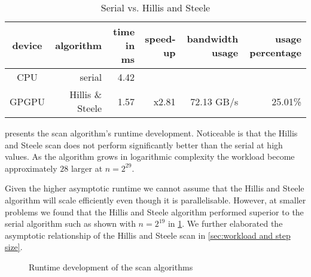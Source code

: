 \begin{table}[htb]
  \centering
  \begin{tabular}{c r | r r r r}
    \toprule
    device & algorithm & time in ms & speed-up & bandwidth usage & usage percentage\\
    \midrule
    CPU & serial  & 4.42 &  &  &  \\
    GPGPU & Hillis \& Steele & 1.57 & x2.81 & 72.13 GB/s & 25.01\% \\
    \bottomrule
  \end{tabular}
  \caption{Serial vs. Hillis and Steele}
  \label{tab:cpu vs hillis steele}
\end{table}

 presents the scan algorithm's runtime development.
Noticeable is that the Hillis and Steele scan does not perform significantly better than the serial at high values.
As the algorithm grows in logarithmic complexity the workload become approximately $28$ larger at $n=2^{29}$.

Given the higher asymptotic runtime we cannot assume that the Hillis and Steele algorithm will scale efficiently even though it is parallelisable.
However, at smaller problems we found that the Hillis and Steele algorithm performed superior to the serial algorithm such as shown with $n = 2^{19}$ in \cref{tab:cpu vs hillis steele}.
We further elaborated the asymptotic relationship of the Hillis and Steele scan in \cref{sec:workload and step size}.

\begin{figure}[htb]
  \centering
  
  \caption{Runtime development of the scan algorithms}
  \label{fig:scan plot}
\end{figure}%
